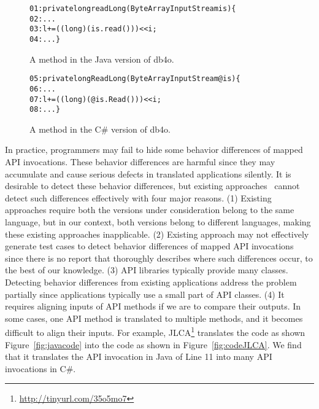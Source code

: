 \begin{figure}[t]
\begin{CodeOut}%
\begin{alltt}
01: private long readLong(ByteArrayInputStream is)\{
02:  ...
03:  l += ((long) (is.read())) << i;
04: ...\}
\end{alltt}
\end{CodeOut}\vspace*{-4ex}
\caption{A method in the Java version of db4o.}\vspace*{-2ex}
\label{fig:db4ojava}
\begin{CodeOut}%
\begin{alltt}
05: private long ReadLong(ByteArrayInputStream @is)\{
06:  ...
07:  l += ((long)(@is.Read())) << i;
08:  ...\}
\end{alltt}
\end{CodeOut}\vspace*{-4ex}
\caption{A method in the C\# version of db4o.}\vspace*{-4ex}
\label{fig:db40net}
\end{figure}

In practice, programmers may fail to hide some behavior differences of mapped API invocations. These behavior differences are harmful since they may accumulate and cause serious defects in translated applications silently. It is desirable to detect these behavior differences, but existing approaches~\cite{taneja08diffgen, robert07difference} cannot detect such differences effectively with four major reasons. (1) Existing approaches require both the versions under consideration belong to the same language, but in our context, both versions belong to different languages, making these existing approaches inapplicable. (2) Existing approach may not effectively generate test cases to detect behavior differences of mapped API invocations since there is no report that thoroughly describes where such differences occur, to the best of our knowledge. (3) API libraries typically provide many classes. Detecting behavior differences from existing applications address the problem partially since applications typically use a small part of API classes. (4) It requires aligning inputs of API methods if we are to compare their outputs. In some cases, one API method is translated to multiple methods, and it becomes difficult to align their inputs. For example, JLCA\footnote{\url{http://tinyurl.com/35o5mo7}} translates the code as shown Figure~\ref{fig:javacode} into the code as shown in Figure~\ref{fig:codeJLCA}. We find that it translates the API invocation in Java of Line 11 into many API invocations in C\#.


